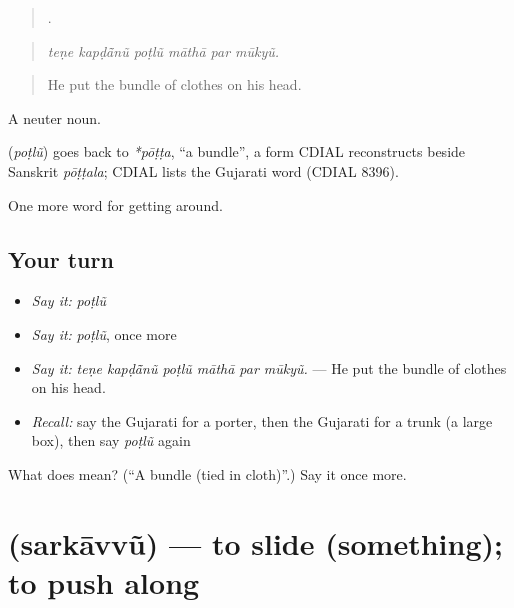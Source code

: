 \begin{quote}
     .
\end{quote}

\begin{quote}
\emph{teṇe kapḍā̃nũ poṭlũ māthā par mūkyũ.}
\end{quote}

\begin{quote}
He put the bundle of clothes on his head.
\end{quote}

A neuter noun.

\begin{cousinweb}
\textbf{} (\emph{poṭlũ}) goes back to \emph{*pōṭṭa}, \textquotedblleft{}a bundle\textquotedblright{}, a form CDIAL reconstructs beside Sanskrit \emph{pōṭṭala}; CDIAL lists the Gujarati word (CDIAL 8396).
\end{cousinweb}

\begin{grammarlens}[title={What you've built}]
One more word for getting around.
\end{grammarlens}

\subsection*{Your turn}
\begin{itemize}
\raggedright
  \item \emph{Say it:} \emph{poṭlũ}
  \item \emph{Say it:} \emph{poṭlũ}, once more
  \item \emph{Say it:} \emph{teṇe kapḍā̃nũ poṭlũ māthā par mūkyũ.} — He put the bundle of clothes on his head.
  \item \emph{Recall:} say the Gujarati for a porter, then the Gujarati for a trunk (a large box), then say \emph{poṭlũ} again
\end{itemize}

\begin{tcolorbox}[breakable,colback=teal!4,colframe=teal!35!black,title={Before you move on}]
What does  mean? (\textquotedblleft{}A bundle (tied in cloth)\textquotedblright{}.) Say it once more.
\end{tcolorbox}
\section[\texorpdfstring{\gu{સરકાવવું} (sarkāvvũ)}{સરકાવવું (sarkāvvũ)}]{ (sarkāvvũ) — to slide (something); to push along}

